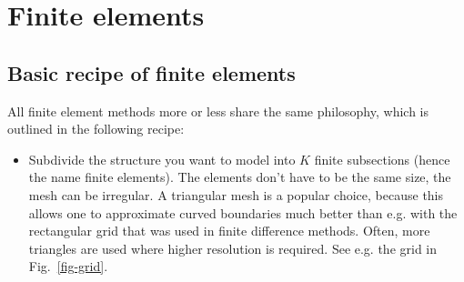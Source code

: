 \section{Finite elements}

\subsection{Basic recipe of finite elements}

All finite element methods more or less share the same philosophy, which is outlined in the following recipe:

\begin{itemize}
\item
Subdivide the structure you want to model into $K$ finite subsections (hence the name finite elements). The elements don't have to be the same size, the mesh can be irregular. A triangular mesh is a popular choice, because this allows one to approximate curved boundaries much better than e.g. with the rectangular grid that was used in finite difference methods. Often, more triangles are used where higher resolution is required. See e.g. the grid in Fig.~\ref{fig-grid}.


\end{itemize}
